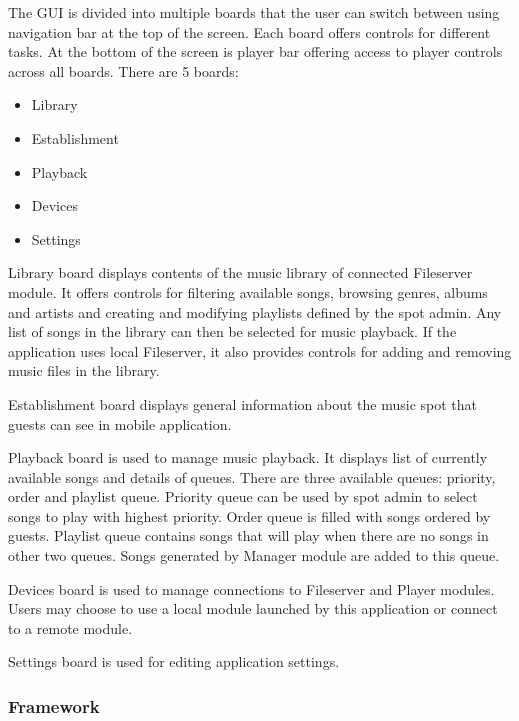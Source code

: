 The GUI is divided into multiple boards that the user can switch between using navigation bar at the top of the screen. Each board offers controls for different tasks. At the bottom of the screen is player bar offering access to player controls across all boards. There are 5 boards:
\begin{itemize}
    \item Library
    \item Establishment
    \item Playback
    \item Devices
    \item Settings
\end{itemize}
\par
Library board displays contents of the music library of connected Fileserver module. It offers controls for filtering available songs, browsing genres, albums and artists and creating and modifying playlists defined by the spot admin. Any list of songs in the library can then be selected for music playback. If the application uses local Fileserver, it also provides controls for adding and removing music files in the library.
\par
Establishment board displays general information about the music spot that guests can see in mobile application.
\par
Playback board is used to manage music playback. It displays list of currently available songs and details of queues. There are three available queues: priority, order and playlist queue. Priority queue can be used by spot admin to select songs to play with highest priority. Order queue is filled with songs ordered by guests. Playlist queue contains songs that will play when there are no songs in other two queues. Songs generated by Manager module are added to this queue.
\par
Devices board is used to manage connections to Fileserver and Player modules. Users may choose to use a local module launched by this application or connect to a remote module.
\par
Settings board is used for editing application settings.

\subsubsection{Framework}


